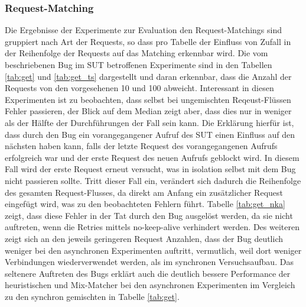 \documentclass[12pt,a4paper]{report}
\begin{document}
\subsubsection{Request-Matching}
Die Ergebnisse der Experimente zur Evaluation den Request-Matchings sind gruppiert nach Art der Requests, so dass pro Tabelle
der Einfluss von Zufall in der Reihenfolge der Requests auf das Matching erkennbar wird. Die vom beschriebenen Bug im SUT
betroffenen Experimente sind in den Tabellen \ref{tab:get} und \ref{tab:get_ts} dargestellt und daran erkennbar, dass die Anzahl
der Requests von den vorgesehenen 10 und 100 abweicht. Interessant in diesen Experimenten ist zu beobachten, dass selbst bei
ungemischten Reqeust-Flüssen Fehler passieren, der Blick auf dem Median zeigt aber, dass dies nur in weniger als der Hälfte der
Durchführungen der Fall sein kann. Die Erklärung hierfür ist, dass durch den Bug ein vorangegangener Aufruf des SUT einen
Einfluss auf den nächsten haben kann, falls der letzte Request des vorangegangenen Aufrufs erfolgreich war und der erste Request
des neuen Aufrufs geblockt wird. In diesem Fall wird der erste Request erneut versucht, was in isolation selbst mit dem Bug
nicht passieren sollte. Tritt dieser Fall ein, verändert sich dadurch die Reihenfolge des gesamten Request-Flusses, da direkt am
Anfang ein zusätzlicher Request eingefügt wird, was zu den beobachteten Fehlern führt. Tabelle \ref{tab:get_nka} zeigt, dass
diese Fehler in der Tat durch den Bug ausgelöst werden, da sie nicht auftreten, wenn die Retries mittels no-keep-alive
verhindert werden. Des weiteren zeigt sich an den jeweils geringeren Request Anzahlen, dass der Bug deutlich weniger bei den
asynchronen Experimenten auftritt, vermutlich, weil dort weniger Verbindungen wiederverwendet werden, als im synchronen
Versuchsaufbau. Das seltenere Auftreten des Bugs erklärt auch die deutlich bessere Performance der heuristischen und Mix-Matcher
bei den asynchronen Experimenten im Vergleich zu den synchron gemischten in Tabelle \ref{tab:get}.
\end{document}
